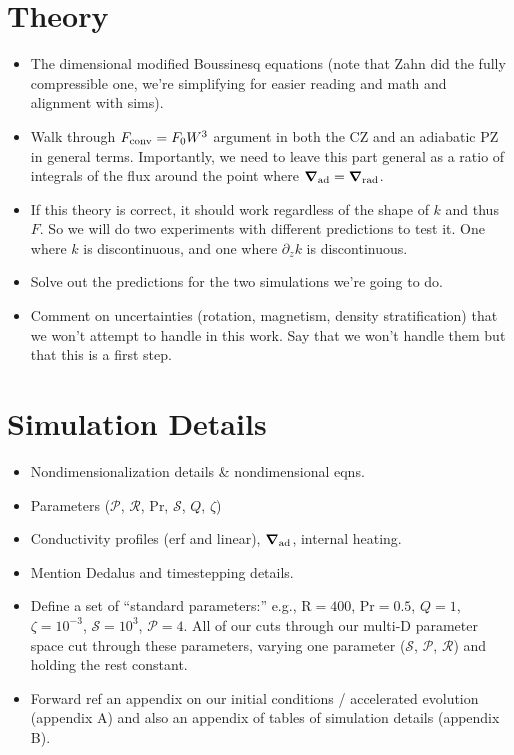 \documentclass[12pt]{article}
\renewcommand{\vec}[1]{\boldsymbol{#1}}
\newcommand{\grad}{\vec{\nabla}}
\begin{document}
\section{Theory}
\begin{itemize}
\item The dimensional modified Boussinesq equations (note that Zahn did the fully compressible one, we're simplifying for easier reading and math and alignment with sims).
\item Walk through $F_{\rm{conv}} = F_0 W^3$ argument in both the CZ and an adiabatic PZ in general terms.
Importantly, we need to leave this part general as a ratio of integrals of the flux around the point where $\grad_{\rm{ad}} = \grad_{\rm{rad}}$.
\item If this theory is correct, it should work regardless of the shape of $k$ and thus $F$. So we will do two experiments with different predictions to test it.
One where $k$ is discontinuous, and one where $\partial_z k$ is discontinuous.
\item Solve out the predictions for the two simulations we're going to do.
\item Comment on uncertainties (rotation, magnetism, density stratification) that we won't attempt to handle in this work.
Say that we won't handle them but that this is a first step.
\end{itemize}

\section{Simulation Details}
\begin{itemize}
\item Nondimensionalization details \& nondimensional eqns.
\item Parameters ($\mathcal{P}$, $\mathcal{R}$, Pr, $\mathcal{S}$, $Q$, $\zeta$)
\item Conductivity profiles (erf and linear), $\grad_{\rm{ad}}$, internal heating.
\item Mention Dedalus \citep{burns_etal_2020} and timestepping details.
\item Define a set of ``standard parameters:'' e.g., $\mathrm{R} = 400$, $\mathrm{Pr} = 0.5$, $Q = 1$, $\zeta = 10^{-3}$, $\mathcal{S} = 10^3$, $\mathcal{P} = 4$.
All of our cuts through our multi-D parameter space cut through these parameters, varying one parameter ($\mathcal{S}$, $\mathcal{P}$, $\mathcal{R}$) and holding the rest constant.
\item Forward ref an appendix on our initial conditions / accelerated evolution (appendix A) and also an appendix of tables of simulation details (appendix B).
\end{itemize}
\end{document}
